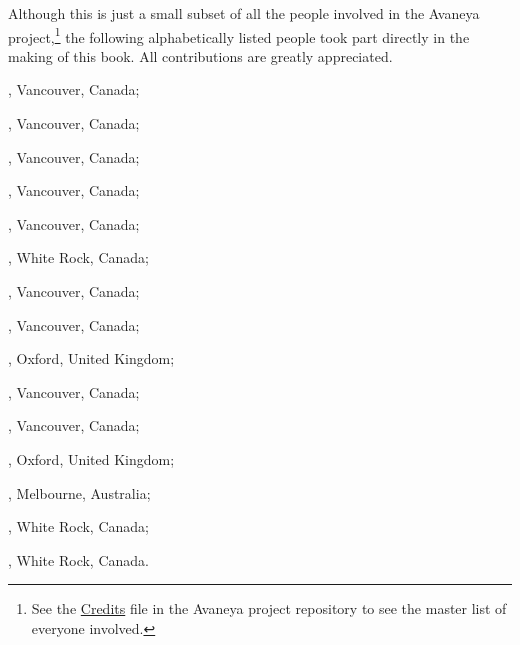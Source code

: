 

Although this is just a small subset of all the people involved in the Avaneya project,\footnote{See the \href{https://bazaar.launchpad.net/~avaneya/avaneya/trunk/view/head:/Credits}{Credits} file in the Avaneya project repository to see the master list of everyone involved.} the following alphabetically listed people took part directly in the making of this book. All contributions are greatly appreciated.



\startitemize[joinedup]
\item {}, Vancouver, Canada;
\item {}, Vancouver, Canada;
\item {}, Vancouver, Canada;
\item {}, Vancouver, Canada;
\item {}, Vancouver, Canada;
\item {}, White Rock, Canada;
\item {}, Vancouver, Canada;
\item {}, Vancouver, Canada;
\item {}, Oxford, United Kingdom;
\item {}, Vancouver, Canada;
\stopitemize


\startitemize[joinedup]
\item {}, Vancouver, Canada;
\item {}, Oxford, United Kingdom;
\stopitemize


\startitemize[joinedup]
\item {}, Melbourne, Australia;
\item {}, White Rock, Canada;
\stopitemize


\startitemize[joinedup]
\item {}, White Rock, Canada.
\stopitemize

\StopChapter


